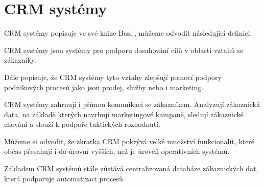 \section{CRM systémy}
CRM systémy popisuje ve své knize Basl \cite{Basl2012}, můžeme odvodit následující definici:
\begin{definition}
CRM systémy jsou systémy pro podporu dosahování cílů v oblasti vztahů se zákazníky. 
\end{definition}

Dále popisuje, že CRM systémy tyto vztahy zlepšují pomocí podpory podnikových procesů jako jsou prodej, služby nebo i marketing. 

CRM systémy zahrnují i přímou komunikaci se zákazníkem. Analyzují zákaznická data, na základě kterých navrhují marketingové kampaně, sledují zákaznické chování a slouží k podpoře taktických rozhodnutí.

Můžeme si odvodit, že zkratka CRM pokrývá velké množství funkcionalit, které občas přesahují i do úrovní vyšších, než je úroveň operativních systémů. 

Základem CRM systémů stále zůstává centralizovaná databáze zákaznických dat, která podporuje automatizaci procesů. \cite{Basl2012}
